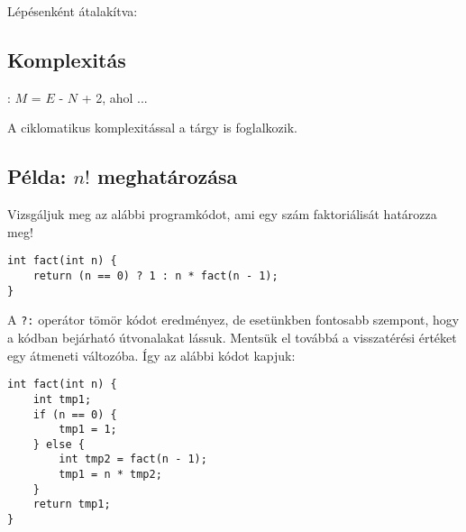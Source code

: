 
Lépésenként átalakítva:

\begin{minipage}{0.2\linewidth}
\end{minipage}
\begin{minipage}{0.35\linewidth}
\end{minipage}
\begin{minipage}{0.45\linewidth}
\end{minipage}

\subsection{Komplexitás}

\begin{definicio}
: $M$ = $E$ - $N$ + 2, ahol ...
\end{definicio}


\begin{megjegyzes}
	A ciklomatikus komplexitással a \szofttech tárgy is foglalkozik.
\end{megjegyzes}

\subsection{Példa: $n!$ meghatározása}

Vizsgáljuk meg az alábbi programkódot, ami egy szám faktoriálisát határozza meg!

\begin{lstlisting}
int fact(int n) {
	return (n == 0) ? 1 : n * fact(n - 1);
}
\end{lstlisting}

A \lstinline{?:} operátor tömör kódot eredményez, de esetünkben fontosabb szempont, hogy a kódban bejárható útvonalakat lássuk. Mentsük el továbbá a visszatérési értéket egy átmeneti változóba. Így az alábbi kódot kapjuk:

\begin{minipage}{\balhasab}
\begin{lstlisting}
int fact(int n) {
	int tmp1;
	if (n == 0) {
		tmp1 = 1;
	} else {
		int tmp2 = fact(n - 1);
		tmp1 = n * tmp2;
	}
	return tmp1;
}
\end{lstlisting}
\end{minipage}
\begin{minipage}{\jobbhasab}
\end{minipage}

